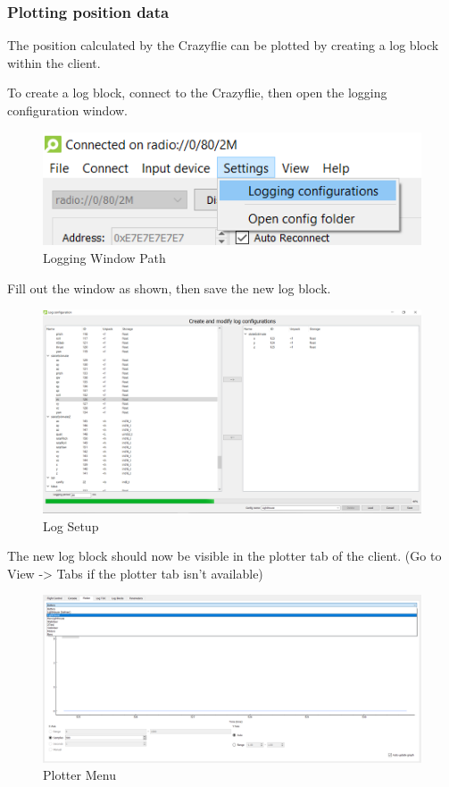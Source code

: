 \hypertarget{plotting-position-data}{%
\subsubsection{Plotting position data}\label{plotting-position-data}}

The position calculated by the Crazyflie can be plotted by creating a
log block within the client.

To create a log block, connect to the Crazyflie, then open the logging
configuration window.

\begin{figure}
\centering
\includegraphics{images/logConfigMenu.png}
\caption{Logging Window Path}
\end{figure}

Fill out the window as shown, then save the new log block.

\begin{figure}
\centering
\includegraphics{images/logSetup.png}
\caption{Log Setup}
\end{figure}

The new log block should now be visible in the plotter tab of the
client. (Go to View -\textgreater{} Tabs if the plotter tab isn't
available)

\begin{figure}
\centering
\includegraphics{images/plotterMenu.png}
\caption{Plotter Menu}
\end{figure}


